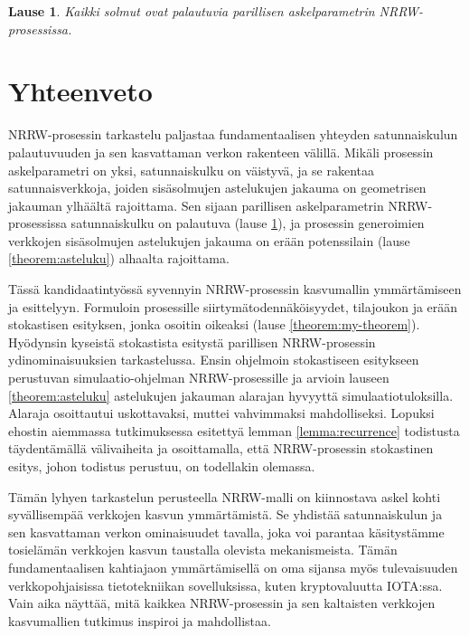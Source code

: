 \documentclass[finnish, 12pt, a4paper, sci, utf8, pdfa]{aaltothesis}
\newtheorem{theorem}{Lause}
\begin{document}
\begin{theorem}
Kaikki solmut ovat palautuvia parillisen askelparametrin NRRW-prosessissa. 
   \label{theorem:actual-recurrence}
\end{theorem}

\section{Yhteenveto}

NRRW-prosessin tarkastelu paljastaa fundamentaalisen yhteyden satunnaiskulun palautuvuuden ja sen kasvattaman verkon rakenteen välillä. Mikäli prosessin askelparametri on yksi,
satunnaiskulku on väistyvä, ja se rakentaa satunnaisverkkoja, joiden sisäsolmujen astelukujen jakauma on geometrisen jakauman ylhäältä rajoittama. Sen sijaan parillisen askelparametrin
NRRW-prosessissa satunnaiskulku on palautuva (lause \ref{theorem:actual-recurrence}), ja prosessin generoimien verkkojen sisäsolmujen astelukujen jakauma on erään potenssilain 
(lause \ref{theorem:asteluku}) alhaalta rajoittama. 

Tässä kandidaatintyössä syvennyin NRRW-prosessin kasvumallin ymmärtämiseen ja esittelyyn. Formuloin prosessille siirtymätodennäköisyydet, tilajoukon ja erään stokastisen esityksen,
jonka osoitin oikeaksi (lause \ref{theorem:my-theorem}). Hyödynsin kyseistä stokastista esitystä parillisen NRRW-prosessin ydinominaisuuksien tarkastelussa. Ensin ohjelmoin stokastiseen
esitykseen perustuvan simulaatio-ohjelman NRRW-prosessille ja arvioin lauseen \ref{theorem:asteluku} astelukujen jakauman alarajan hyvyyttä simulaatiotuloksilla. Alaraja osoittautui
uskottavaksi, muttei vahvimmaksi mahdolliseksi. Lopuksi ehostin aiemmassa tutkimuksessa esitettyä lemman \ref{lemma:recurrence} todistusta täydentämällä välivaiheita ja osoittamalla, että NRRW-prosessin stokastinen esitys, johon todistus perustuu, on todellakin olemassa.

Tämän lyhyen tarkastelun perusteella NRRW-malli on kiinnostava askel kohti syvällisempää verkkojen kasvun ymmärtämistä. Se yhdistää satunnaiskulun ja sen kasvattaman verkon ominaisuudet
tavalla, joka voi parantaa käsitystämme tosielämän verkkojen kasvun taustalla olevista mekanismeista. Tämän fundamentaalisen kahtiajaon ymmärtämisellä on oma sijansa myös tulevaisuuden
verkkopohjaisissa tietotekniikan sovelluksissa, kuten kryptovaluutta IOTA:ssa. Vain aika näyttää, mitä kaikkea NRRW-prosessin ja sen kaltaisten verkkojen kasvumallien tutkimus inspiroi
ja mahdollistaa.

\clearpage
\end{document}
